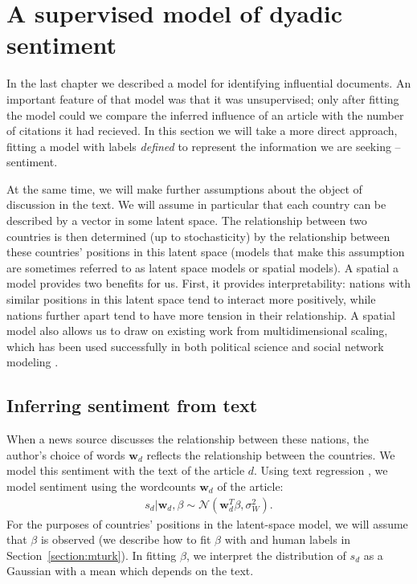 \section{A supervised model of dyadic sentiment}

\label{section:foreign_relations_supervised_model}

In the last chapter we described a model for identifying influential
documents.  An important feature of that model was that it was
unsupervised; only after fitting the model could we compare the
inferred influence of an article with the number of citations it had
recieved.  In this section we will take a more direct approach,
fitting a model with labels \emph{defined} to represent the
information we are seeking -- sentiment.

At the same time, we will make further assumptions about the object of
discussion in the text. We will assume in particular that each country
can be described by a vector in some latent space.  The relationship
between two countries is then determined (up to stochasticity) by the
relationship between these countries' positions in this latent space
(models that make this assumption are sometimes referred to as latent
space models or spatial models).  A spatial a model provides two
benefits for us. First, it provides interpretability: nations with
similar positions in this latent space tend to interact more
positively, while nations further apart tend to have more tension in
their relationship.  A spatial model also allows us to draw on
existing work from multidimensional scaling, which has been used
successfully in both political science \cite{martin:2002,jackman:2001}
and social network modeling \cite{hoff:2002,chang:2009}.

\subsection{Inferring sentiment from text}
\label{section:text_regression}
When a news source discusses the relationship between these nations,
the author's choice of words $\bm w_d$ reflects the relationship
between the countries.  We model this sentiment with the text of the
article $d$.  Using text regression \cite{kogan:2009}, we model
sentiment using the wordcounts $\bm w_d$ of the article:
\begin{align}
  s_d | \bm w_d, \beta \sim \mathcal{N}( \bm w_d^T \beta, \sigma_W^2 ).
  \label{eq:sentiment_text}
\end{align}
For the purposes of countries' positions in the latent-space model, we
will assume that $\beta$ is observed (we describe how to fit $\beta$
with  and human labels in
Section~\ref{section:mturk}).  In fitting $\beta$, we interpret the
distribution of $s_d$ as a Gaussian with a mean which depends on the
text.

